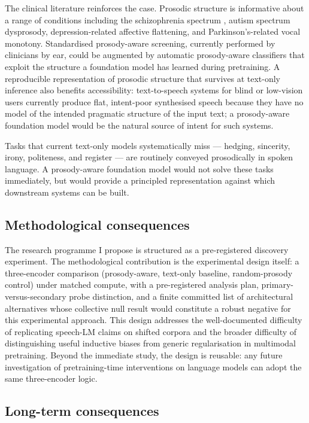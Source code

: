 \documentclass[11pt,letterpaper]{article}
\begin{document}
The clinical literature reinforces the case. Prosodic structure is informative about a range of conditions including the schizophrenia spectrum \citep{lucarini2020}, autism spectrum dysprosody, depression-related affective flattening, and Parkinson's-related vocal monotony. Standardised prosody-aware screening, currently performed by clinicians by ear, could be augmented by automatic prosody-aware classifiers that exploit the structure a foundation model has learned during pretraining. A reproducible representation of prosodic structure that survives at text-only inference also benefits accessibility: text-to-speech systems for blind or low-vision users currently produce flat, intent-poor synthesised speech because they have no model of the intended pragmatic structure of the input text; a prosody-aware foundation model would be the natural source of intent for such systems.

Tasks that current text-only models systematically miss --- hedging, sincerity, irony, politeness, and register --- are routinely conveyed prosodically in spoken language. A prosody-aware foundation model would not solve these tasks immediately, but would provide a principled representation against which downstream systems can be built.

\subsection{Methodological consequences}

The research programme I propose is structured as a pre-registered discovery experiment. The methodological contribution is the experimental design itself: a three-encoder comparison (prosody-aware, text-only baseline, random-prosody control) under matched compute, with a pre-registered analysis plan, primary-versus-secondary probe distinction, and a finite committed list of architectural alternatives whose collective null result would constitute a robust negative for this experimental approach. This design addresses the well-documented difficulty of replicating speech-LM claims on shifted corpora and the broader difficulty of distinguishing useful inductive biases from generic regularisation in multimodal pretraining. Beyond the immediate study, the design is reusable: any future investigation of pretraining-time interventions on language models can adopt the same three-encoder logic.

\subsection{Long-term consequences}
\end{document}
